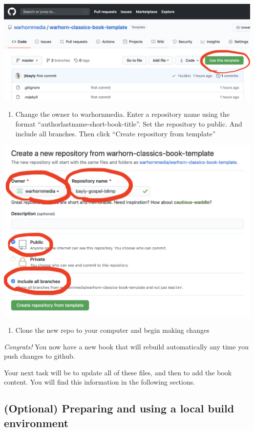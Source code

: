 \documentclass[
]{book}
\providecommand{\tightlist}{%
  \setlength{\itemsep}{0pt}\setlength{\parskip}{0pt}}
\begin{document}
\begin{center}\includegraphics[width=0.65\linewidth]{images/screenshot1} \end{center}

\begin{enumerate}
\def\labelenumi{\arabic{enumi}.}
\setcounter{enumi}{1}
\tightlist
\item
  Change the owner to warhornmedia. Enter a repository name using the format ``authorlastname-short-book-title''. Set the repository to public. And include all branches. Then click ``Create repository from template''
\end{enumerate}

\begin{center}\includegraphics[width=0.65\linewidth]{images/screenshot2} \end{center}

\begin{enumerate}
\def\labelenumi{\arabic{enumi}.}
\setcounter{enumi}{2}
\tightlist
\item
  Clone the new repo to your computer and begin making changes
\end{enumerate}

\emph{Congrats!} You now have a new book that will rebuild automatically any time you push changes to github.

Your next task will be to update all of these files, and then to add the book content. You will find this information in the following sections.

\hypertarget{optional-preparing-and-using-a-local-build-environment}{%
\subsection{(Optional) Preparing and using a local build environment}\label{optional-preparing-and-using-a-local-build-environment}}
\end{document}
